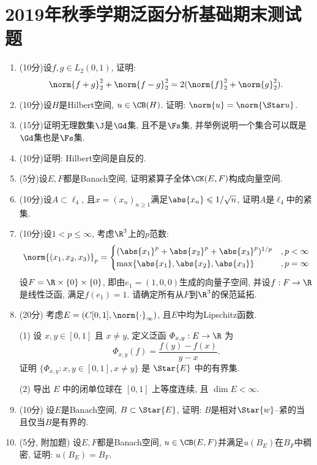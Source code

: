 
\chapter{2019年秋季学期泛函分析基础期末测试题}

\begin{enumerate}
	\item (10分)设$ f, g\in L_2(0,1) $, 证明:
	\[
	\norm{f+g}_2^2+\norm{f-g}_2^2=2(\norm{f}_2^2+\norm{g}_2^2).
	\]
	\item (10分)设$ H $是Hilbert空间, $ u\in\CB(H) $. 证明: $ \norm{u}=\norm{\Star u} $.
	\item (15分)证明无理数集$ \J $是$ \Gd $集, 且不是$ \Fs $集, 并举例说明一个集合可以既是$ \Gd $集也是$ \Fs $集.
	\item (10分)证明: Hilbert空间是自反的.
	\item (5分)设$ E, F $都是Banach空间, 证明紧算子全体$ \CK(E,F) $构成向量空间.
	\item (10分)设$ A\subset\ell_4 $, 且$ x=(x_n)_{n\geqslant 1} $满足$ \abs{x_n}\leqslant1/\sqrt{n} $, 证明$ A $是$ \ell_4 $中的紧集.
	\item (10分)设$ 1<p\leqslant \infty $, 考虑$ \R^3 $上的$ p $范数:
	\[
	\norm{(x_1,x_2,x_3)}_p=\begin{cases}
	(\abs{x_1}^p+\abs{x_2}^p+\abs{x_3}^p)^{1/p} & ,p<\infty\\
	\max\{ \abs{x_1},\abs{x_2},\abs{x_3} \} &,p=\infty
	\end{cases}
	\]
	设$ F=\R\times\{0\}\times\{0\} $, 即由$ e_1=(1,0,0) $生成的向量子空间, 并设$ f : F\to\R $是线性泛函, 满足$ f(e_1)=1 $. 请确定所有从$ F $到$ \R^3 $的保范延拓.
	\item (20分) 考虑$ E=(C[0,1],\norm{\cdot}_\infty) $, 且$ E $中均为Lipschitz函数.

	\hspace{4em}(1) 设 $ x, y\in[0, 1] $ 且 $ x\ne y $, 定义泛函 $ \varPhi_{x, y}:E\to\R $ 为
		\[
			\varPhi_{x, y}(f)=\frac{f(y)-f(x)}{y-x}.
		\]
	证明 $\{ \varPhi_{x, y}:x, y\in[0, 1], x\ne y \}$ 是 $ \Star{E} $ 中的有界集.

	\hspace{4em}(2) 导出 $ E $ 中的闭单位球在 $ [0, 1] $ 上等度连续, 且 $ \dim E<\infty $.
	
	\item (10分) 设$ E $是Banach空间, $ B\subset\Star{E} $, 证明: $ B $是相对$ \Star{w} $--紧的当且仅当$ B $是有界的.
	\item (5分, 附加题) 设$ E, F $都是Banach空间, $ u\in\CB(E,F) $并满足$ u(B_E) $在$ B_F $中稠密, 证明: $ u(B_E)=B_F $.
\end{enumerate}